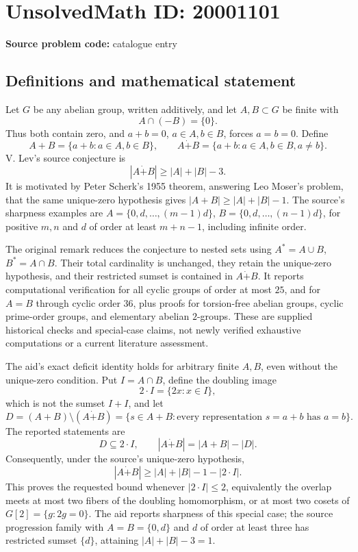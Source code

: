 \documentclass[11pt]{article}
\begin{document}
\section*{UnsolvedMath ID: 20001101}
\textbf{Source problem code:} catalogue entry
\subsection{Definitions and mathematical statement}
Let \(G\) be any abelian group, written additively, and let \(A,B\subset G\) be finite with
\[
 A\cap(-B)=\{0\}.
\]
Thus both contain zero, and \(a+b=0\), \(a\in A,b\in B\), forces \(a=b=0\). Define
\[
 A+B=\{a+b:a\in A,b\in B\},\qquad
 A\mathbin{\dot+}B=\{a+b:a\in A,b\in B,a\ne b\}.
\]
V. Lev's source conjecture is
\[
 |A\mathbin{\dot+}B|\ge|A|+|B|-3.
\]
It is motivated by Peter Scherk's 1955 theorem, answering Leo Moser's problem, that the same unique-zero hypothesis gives \(|A+B|\ge|A|+|B|-1\). The source's sharpness examples are \(A=\{0,d,\ldots,(m-1)d\}\), \(B=\{0,d,\ldots,(n-1)d\}\), for positive \(m,n\) and \(d\) of order at least \(m+n-1\), including infinite order.

The original remark reduces the conjecture to nested sets using \(A^*=A\cup B\), \(B^*=A\cap B\). Their total cardinality is unchanged, they retain the unique-zero hypothesis, and their restricted sumset is contained in \(A\mathbin{\dot+}B\). It reports computational verification for all cyclic groups of order at most \(25\), and for \(A=B\) through cyclic order \(36\), plus proofs for torsion-free abelian groups, cyclic prime-order groups, and elementary abelian \(2\)-groups. These are supplied historical checks and special-case claims, not newly verified exhaustive computations or a current literature assessment.

The aid's exact deficit identity holds for arbitrary finite \(A,B\), even without the unique-zero condition. Put \(I=A\cap B\), define the doubling image
\[
 2\cdot I=\{2x:x\in I\},
\]
which is not the sumset \(I+I\), and let
\[
 D=(A+B)\setminus(A\mathbin{\dot+}B)
 =\{s\in A+B:\text{every representation }s=a+b\text{ has }a=b\}.
\]
The reported statements are
\[
 D\subseteq2\cdot I,\qquad
 |A\mathbin{\dot+}B|=|A+B|-|D|.
\]
Consequently, under the source's unique-zero hypothesis,
\[
 |A\mathbin{\dot+}B|\ge|A|+|B|-1-|2\cdot I|.
\]
This proves the requested bound whenever \(|2\cdot I|\le2\), equivalently the overlap meets at most two fibers of the doubling homomorphism, or at most two cosets of \(G[2]=\{g:2g=0\}\). The aid reports sharpness of this special case; the source progression family with \(A=B=\{0,d\}\) and \(d\) of order at least three has restricted sumset \(\{d\}\), attaining \(|A|+|B|-3=1\).
\end{document}
